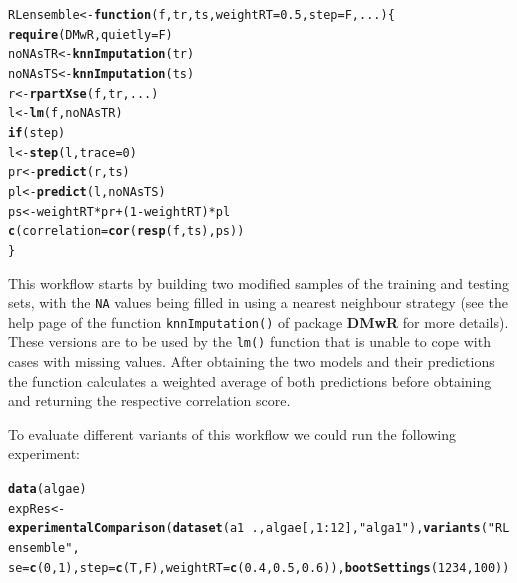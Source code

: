 \documentclass[10pt,a4paper]{article}\usepackage[]{graphicx}\usepackage[]{color}
\makeatletter
\newcommand{\hlnum}[1]{\textcolor[rgb]{0.686,0.059,0.569}{#1}}%
\newcommand{\hlstr}[1]{\textcolor[rgb]{0.192,0.494,0.8}{#1}}%
\newcommand{\hlopt}[1]{\textcolor[rgb]{0,0,0}{#1}}%
\newcommand{\hlstd}[1]{\textcolor[rgb]{0.345,0.345,0.345}{#1}}%
\newcommand{\hlkwa}[1]{\textcolor[rgb]{0.161,0.373,0.58}{\textbf{#1}}}%
\newcommand{\hlkwb}[1]{\textcolor[rgb]{0.69,0.353,0.396}{#1}}%
\newcommand{\hlkwc}[1]{\textcolor[rgb]{0.333,0.667,0.333}{#1}}%
\newcommand{\hlkwd}[1]{\textcolor[rgb]{0.737,0.353,0.396}{\textbf{#1}}}%
\newenvironment{kframe}{%
 \def\at@end@of@kframe{}%
 \ifinner\ifhmode%
  \def\at@end@of@kframe{\end{minipage}}%
  \begin{minipage}{\columnwidth}%
 \fi\fi%
 \def\FrameCommand##1{\hskip\@totalleftmargin \hskip-\fboxsep
 \colorbox{shadecolor}{##1}\hskip-\fboxsep
     \hskip-\linewidth \hskip-\@totalleftmargin \hskip\columnwidth}%
 \MakeFramed {\advance\hsize-\width
   \@totalleftmargin\z@ \linewidth\hsize
   \@setminipage}}%
 {\par\unskip\endMakeFramed%
 \at@end@of@kframe}
\newenvironment{knitrout}{}{} %
\makeatother
\begin{document}
\begin{knitrout}
\color{fgcolor}\begin{kframe}
\begin{alltt}
\hlstd{RLensemble} \hlkwb{<-} \hlkwa{function}\hlstd{(}\hlkwc{f}\hlstd{,} \hlkwc{tr}\hlstd{,} \hlkwc{ts}\hlstd{,} \hlkwc{weightRT} \hlstd{=} \hlnum{0.5}\hlstd{,} \hlkwc{step} \hlstd{= F,} \hlkwc{...}\hlstd{) \{}
    \hlkwd{require}\hlstd{(DMwR,} \hlkwc{quietly} \hlstd{= F)}
    \hlstd{noNAsTR} \hlkwb{<-} \hlkwd{knnImputation}\hlstd{(tr)}
    \hlstd{noNAsTS} \hlkwb{<-} \hlkwd{knnImputation}\hlstd{(ts)}
    \hlstd{r} \hlkwb{<-} \hlkwd{rpartXse}\hlstd{(f, tr, ...)}
    \hlstd{l} \hlkwb{<-} \hlkwd{lm}\hlstd{(f, noNAsTR)}
    \hlkwa{if} \hlstd{(step)}
        \hlstd{l} \hlkwb{<-} \hlkwd{step}\hlstd{(l,} \hlkwc{trace} \hlstd{=} \hlnum{0}\hlstd{)}
    \hlstd{pr} \hlkwb{<-} \hlkwd{predict}\hlstd{(r, ts)}
    \hlstd{pl} \hlkwb{<-} \hlkwd{predict}\hlstd{(l, noNAsTS)}
    \hlstd{ps} \hlkwb{<-} \hlstd{weightRT} \hlopt{*} \hlstd{pr} \hlopt{+} \hlstd{(}\hlnum{1} \hlopt{-} \hlstd{weightRT)} \hlopt{*} \hlstd{pl}
    \hlkwd{c}\hlstd{(}\hlkwc{correlation} \hlstd{=} \hlkwd{cor}\hlstd{(}\hlkwd{resp}\hlstd{(f, ts), ps))}
\hlstd{\}}
\end{alltt}
\end{kframe}
\end{knitrout}


This workflow starts by building two modified samples of the training
and testing sets, with the \texttt{NA} values being filled in using a
nearest neighbour strategy (see the help page of the function
\texttt{knnImputation()} of package \textbf{DMwR} for more
details). These versions are to be used by the \texttt{lm()} function
that is unable to cope with cases with missing values. After obtaining
the two models and their predictions the function calculates a
weighted average of both predictions before obtaining and returning
the respective correlation score.

To evaluate different variants of this workflow we could run the
following experiment:

\begin{knitrout}
\color{fgcolor}\begin{kframe}
\begin{alltt}
\hlkwd{data}\hlstd{(algae)}
\hlstd{expRes} \hlkwb{<-} \hlkwd{experimentalComparison}\hlstd{(}\hlkwd{dataset}\hlstd{(a1} \hlopt{~} \hlstd{., algae[,} \hlnum{1}\hlopt{:}\hlnum{12}\hlstd{],} \hlstr{"alga1"}\hlstd{),} \hlkwd{variants}\hlstd{(}\hlstr{"RLensemble"}\hlstd{,}
    \hlkwc{se} \hlstd{=} \hlkwd{c}\hlstd{(}\hlnum{0}\hlstd{,} \hlnum{1}\hlstd{),} \hlkwc{step} \hlstd{=} \hlkwd{c}\hlstd{(T, F),} \hlkwc{weightRT} \hlstd{=} \hlkwd{c}\hlstd{(}\hlnum{0.4}\hlstd{,} \hlnum{0.5}\hlstd{,} \hlnum{0.6}\hlstd{)),} \hlkwd{bootSettings}\hlstd{(}\hlnum{1234}\hlstd{,} \hlnum{100}\hlstd{))}
\end{alltt}
\end{kframe}
\end{knitrout}
\end{document}
